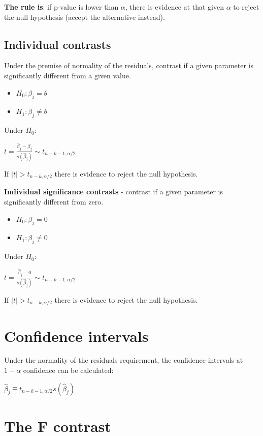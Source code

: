 \documentclass[10pt,landscape]{article}
\begin{document}
\begin{multicols}{3}
\textbf{The rule is}: if p-value is lower than $\alpha$, there is evidence at that given $\alpha$ to reject the null hypothesis (accept the alternative instead).

\subsection*{Individual contrasts}

Under the premise of normality of the residuals, contrast if a given parameter is significantly different from a given value.

\begin{itemize}[leftmargin=*]
\item $H_0: \beta_j = \theta$
\item $H_1: \beta_j \neq \theta$
\end{itemize}

Under $H_0$:

$t = \frac{\hat{\beta}_j - \beta_j}{s(\hat{\beta}_j)} \sim t_{n-k-1, \alpha/2}$

If $\mid t \mid > t_{n-k, \alpha/2}$ there is evidence to reject the null hypothesis.

\textbf{Individual significance contrasts} - contrast if a given parameter is significantly different from zero.

\begin{itemize}[leftmargin=*]
\item $H_0: \beta_j = 0$
\item $H_1: \beta_j \neq 0$
\end{itemize}

Under $H_0$:

$t = \frac{\hat{\beta}_j - 0}{s(\hat{\beta}_j)} \sim t_{n-k-1, \alpha/2}$

If $\mid t \mid > t_{n-k, \alpha/2}$ there is evidence to reject the null hypothesis.

\section*{Confidence intervals}

Under the normality of the residuals requirement, the confidence intervals at $1 - \alpha$ confidence can be calculated:

$\hat{\beta}_j \mp t_{n-k-1, \alpha/2} s(\hat{\beta}_j)$

\section*{The F contrast}


\end{multicols}
\end{document}
